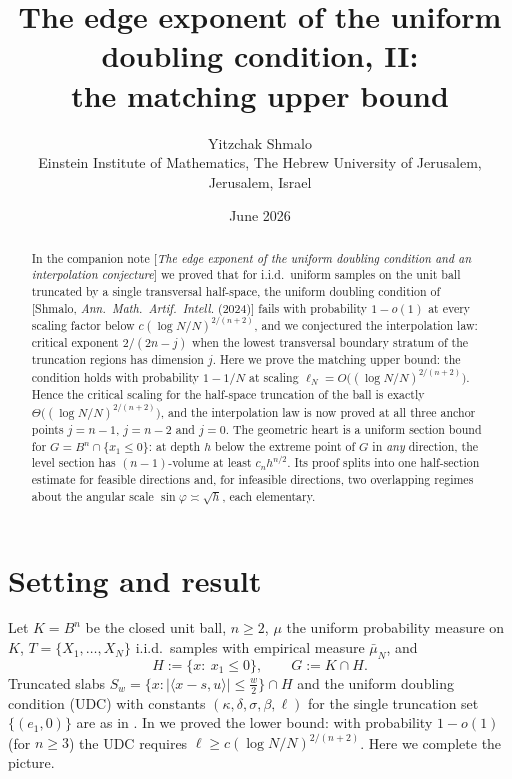 \documentclass[11pt]{article}
\title{The edge exponent of the uniform doubling condition, II:\\
the matching upper bound}
\author{Yitzchak Shmalo\\
\small Einstein Institute of Mathematics, The Hebrew University of Jerusalem, Jerusalem, Israel\\
\small }
\date{June 2026}
\newcommand{\emp}{\bar\mu_N}
\begin{document}
\maketitle

\begin{abstract}
In the companion note [\emph{The edge exponent of the uniform doubling
condition and an interpolation conjecture}] we proved that for i.i.d.\ uniform
samples on the unit ball truncated by a single transversal half-space, the
uniform doubling condition of [Shmalo, \emph{Ann.\ Math.\ Artif.\ Intell.}
(2024)] fails with probability $1-o(1)$ at every scaling factor below
$c(\log N/N)^{2/(n+2)}$, and we conjectured the interpolation law:
critical exponent $2/(2n-j)$ when the lowest transversal boundary stratum of
the truncation regions has dimension $j$.  Here we prove the matching upper
bound: the condition holds with probability $1-1/N$ at scaling
$\ell_N=O\bigl((\log N/N)^{2/(n+2)}\bigr)$.  Hence the critical scaling for
the half-space truncation of the ball is exactly
$\Theta\bigl((\log N/N)^{2/(n+2)}\bigr)$, and the interpolation law is now
proved at all three anchor points $j=n-1$, $j=n-2$ and $j=0$.  The geometric
heart is a uniform section bound for $G=B^n\cap\{x_1\le0\}$: at depth $h$
below the extreme point of $G$ in \emph{any} direction, the level section has
$(n-1)$-volume at least $c_nh^{n/2}$.  Its proof splits into one half-section
estimate for feasible directions and, for infeasible directions, two
overlapping regimes about the angular scale $\sin\varphi\asymp\sqrt h$,
each elementary.
\end{abstract}

\section{Setting and result}\label{sec:intro}

Let $K=B^n$ be the closed unit ball, $n\ge2$, $\mu$ the uniform probability
measure on $K$, $T=\{X_1,\dots,X_N\}$ i.i.d.\ samples with empirical measure
$\emp$, and
\[
H:=\{x:\ x_1\le0\},\qquad G:=K\cap H .
\]
Truncated slabs $S_w=\{x:|\langle x-s,u\rangle|\le\frac w2\}\cap H$ and the
uniform doubling condition (UDC) with constants
$(\kappa,\delta,\sigma,\beta,\ell)$ for the single truncation set
$\{(e_1,0)\}$ are as in \cite{ShmaloUDC,companion2,companion6}.  In
\cite{companion6} we proved the lower bound: with probability $1-o(1)$
(for $n\ge3$) the UDC requires $\ell\ge c(\log N/N)^{2/(n+2)}$.  Here we
complete the picture.
\end{document}
